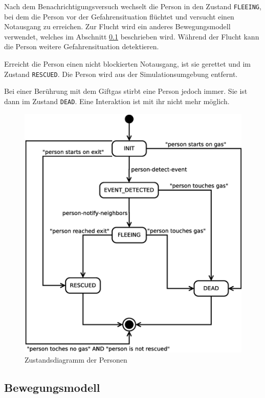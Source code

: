 Nach dem Benachrichtigungsversuch wechselt die Person in den Zustand \verb|FLEEING|, bei dem die Person vor der Gefahrensituation flüchtet und versucht einen Notausgang zu erreichen. Zur Flucht wird ein anderes Bewegungsmodell verwendet, welches im Abschnitt \ref{sec:bewegungsmodell} beschrieben wird. Während der Flucht kann die Person weitere Gefahrensituation detektieren.

Erreicht die Person einen nicht blockierten Notausgang, ist sie gerettet und im Zustand \verb|RESCUED|. Die Person wird aus der Simulationsumgebung entfernt.

Bei einer Berührung mit dem Giftgas stirbt eine Person jedoch immer. Sie ist dann im Zustand \verb|DEAD|. Eine Interaktion ist mit ihr nicht mehr möglich. 


\begin{figure}
\centering
\includegraphics[height=0.6\textwidth]{simulationsumgebung/person.eps}
\caption{Zustandsdiagramm der Personen}
\label{fig:person}
\end{figure}

\subsection{Bewegungsmodell}
\label{sec:bewegungsmodell}


